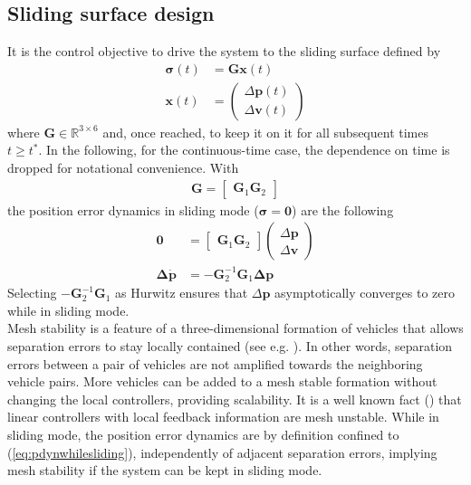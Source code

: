 \documentclass{ifacconf}
\providecommand{\mbf}[1]{\mathbf{#1}}
\begin{document}
\subsection{Sliding surface design}
It is the control objective to drive the system to the sliding surface defined by
\begin{align}
\mbf{\sigma}(t) &= \mbf{G}\mbf{x}(t)
\label{eq:defsigmaconti-} \\
\mbf{x}(t) &=
\begin{pmatrix}
\Delta \mbf{p}(t)\\
\Delta \mbf{v}(t)
\end{pmatrix}
\end{align}
where $ \mbf{G} \in \mathbb{R}^{3 \times 6}$ and, once reached, to keep it on it for all subsequent times $t \geq t^*$. In the following, for the continuous-time case, the dependence on time is dropped for notational convenience. With
\begin{align}
\mbf{G} =
\begin{bmatrix}
\mbf{G}_1 \mbf{G}_2
\end{bmatrix}
\end{align}
the position error dynamics in sliding mode ($\mbf{\sigma} = \mbf{0}$) are the following 
\begin{align} 
\mbf{0}
&=
\begin{bmatrix}
\mbf{G}_1 \mbf{G}_2
\end{bmatrix}
\begin{pmatrix}
\Delta \mbf{p}\\
\Delta \mbf{v}
\end{pmatrix} \\
\mbf{\Delta} \dot{\mbf{p}}
&= - \mbf{G}_2^{-1} \mbf{G}_1 \mbf{\Delta} \mbf{p}
\label{eq:pdynwhilesliding}
\end{align}
Selecting $- \mbf{G}_2^{-1} \mbf{G}_1$ as Hurwitz ensures that $\Delta \mbf{p}$ asymptotically converges to zero while in sliding mode.\\
Mesh stability is a feature of a three-dimensional formation of vehicles that allows separation errors to stay locally contained (see e.g. \cite{Pant2002}). In other words, separation errors between a pair of vehicles are not amplified towards the neighboring vehicle pairs. More vehicles can be added to a mesh stable formation without changing the local controllers, providing scalability. It is a well known fact (\cite{Pant2002}) that linear controllers with local feedback information are mesh unstable.
While in sliding mode, the position error dynamics are by definition confined to (\ref{eq:pdynwhilesliding}), independently of adjacent separation errors, implying mesh stability if the system can be kept in sliding mode.
\end{document}
